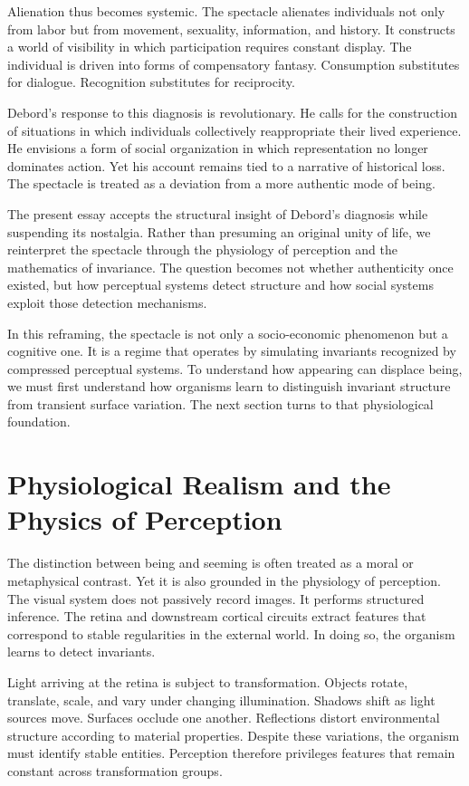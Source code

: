 \documentclass[11pt]{article}
\begin{document}
Alienation thus becomes systemic. The spectacle alienates individuals not only from labor but from movement, sexuality, information, and history. It constructs a world of visibility in which participation requires constant display. The individual is driven into forms of compensatory fantasy. Consumption substitutes for dialogue. Recognition substitutes for reciprocity.

Debord’s response to this diagnosis is revolutionary. He calls for the construction of situations in which individuals collectively reappropriate their lived experience. He envisions a form of social organization in which representation no longer dominates action. Yet his account remains tied to a narrative of historical loss. The spectacle is treated as a deviation from a more authentic mode of being.

The present essay accepts the structural insight of Debord’s diagnosis while suspending its nostalgia. Rather than presuming an original unity of life, we reinterpret the spectacle through the physiology of perception and the mathematics of invariance. The question becomes not whether authenticity once existed, but how perceptual systems detect structure and how social systems exploit those detection mechanisms.

In this reframing, the spectacle is not only a socio-economic phenomenon but a cognitive one. It is a regime that operates by simulating invariants recognized by compressed perceptual systems. To understand how appearing can displace being, we must first understand how organisms learn to distinguish invariant structure from transient surface variation. The next section turns to that physiological foundation.

\section{Physiological Realism and the Physics of Perception}

The distinction between being and seeming is often treated as a moral or metaphysical contrast. Yet it is also grounded in the physiology of perception. The visual system does not passively record images. It performs structured inference. The retina and downstream cortical circuits extract features that correspond to stable regularities in the external world. In doing so, the organism learns to detect invariants.

Light arriving at the retina is subject to transformation. Objects rotate, translate, scale, and vary under changing illumination. Shadows shift as light sources move. Surfaces occlude one another. Reflections distort environmental structure according to material properties. Despite these variations, the organism must identify stable entities. Perception therefore privileges features that remain constant across transformation groups.
\end{document}
